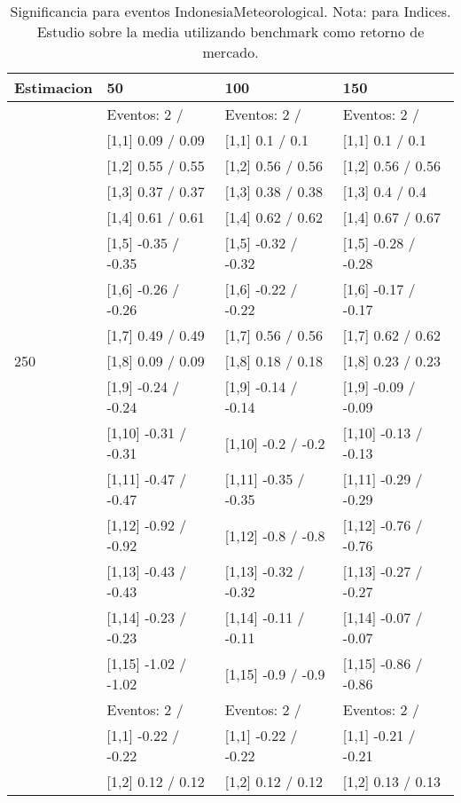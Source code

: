 \begin{table}

\caption{Significancia para eventos IndonesiaMeteorological. Nota: para Indices. Estudio sobre la media utilizando benchmark como retorno de mercado.}
\centering
\begin{tabular}[t]{llll}
\toprule
Estimacion & 50 & 100 & 150\\
\midrule
 & Eventos:  2 / & Eventos:  2 / & Eventos:  2 /\\
 & {}[1,1] 0.09  / 0.09 & {}[1,1] 0.1  / 0.1 & {}[1,1] 0.1  / 0.1\\
 & {}[1,2] 0.55  / 0.55 & {}[1,2] 0.56  / 0.56 & {}[1,2] 0.56  / 0.56\\
 & {}[1,3] 0.37  / 0.37 & {}[1,3] 0.38  / 0.38 & {}[1,3] 0.4  / 0.4\\
 & {}[1,4] 0.61  / 0.61 & {}[1,4] 0.62  / 0.62 & {}[1,4] 0.67  / 0.67\\
\addlinespace
 & {}[1,5] -0.35  / -0.35 & {}[1,5] -0.32  / -0.32 & {}[1,5] -0.28  / -0.28\\
 & {}[1,6] -0.26  / -0.26 & {}[1,6] -0.22  / -0.22 & {}[1,6] -0.17  / -0.17\\
 & {}[1,7] 0.49  / 0.49 & {}[1,7] 0.56  / 0.56 & {}[1,7] 0.62  / 0.62\\
250 & {}[1,8] 0.09  / 0.09 & {}[1,8] 0.18  / 0.18 & {}[1,8] 0.23  / 0.23\\
 & {}[1,9] -0.24  / -0.24 & {}[1,9] -0.14  / -0.14 & {}[1,9] -0.09  / -0.09\\
\addlinespace
 & {}[1,10] -0.31  / -0.31 & {}[1,10] -0.2  / -0.2 & {}[1,10] -0.13  / -0.13\\
 & {}[1,11] -0.47  / -0.47 & {}[1,11] -0.35  / -0.35 & {}[1,11] -0.29  / -0.29\\
 & {}[1,12] -0.92  / -0.92 & {}[1,12] -0.8  / -0.8 & {}[1,12] -0.76  / -0.76\\
 & {}[1,13] -0.43  / -0.43 & {}[1,13] -0.32  / -0.32 & {}[1,13] -0.27  / -0.27\\
 & {}[1,14] -0.23  / -0.23 & {}[1,14] -0.11  / -0.11 & {}[1,14] -0.07  / -0.07\\
\addlinespace
 & {}[1,15] -1.02  / -1.02 & {}[1,15] -0.9  / -0.9 & {}[1,15] -0.86  / -0.86\\
 & Eventos:  2 / & Eventos:  2 / & Eventos:  2 /\\
 & {}[1,1] -0.22  / -0.22 & {}[1,1] -0.22  / -0.22 & {}[1,1] -0.21  / -0.21\\
 & {}[1,2] 0.12  / 0.12 & {}[1,2] 0.12  / 0.12 & {}[1,2] 0.13  / 0.13\\

\end{tabular}
\end{table}
